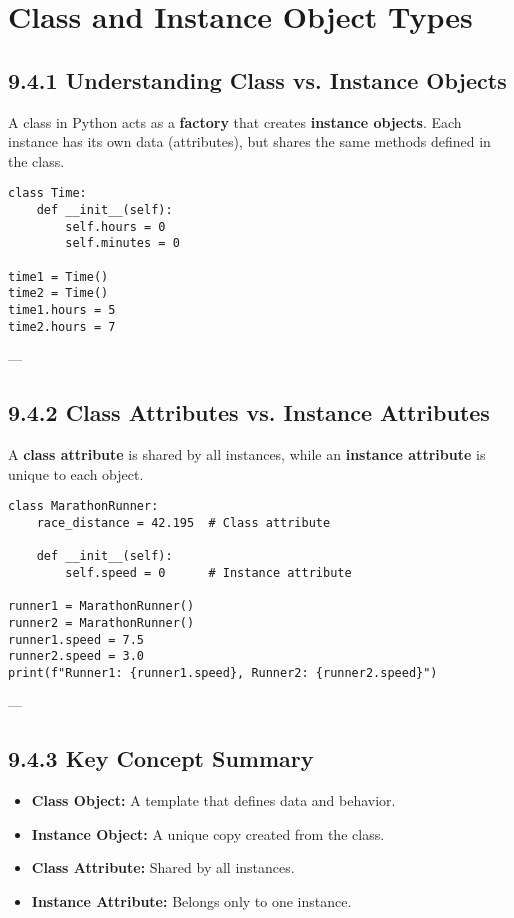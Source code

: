 \chapter{Class and Instance Object Types}

\section*{9.4.1 Understanding Class vs. Instance Objects}

A class in Python acts as a \textbf{factory} that creates \textbf{instance objects}. 
Each instance has its own data (attributes), but shares the same methods defined in the class.

\begin{verbatim}
class Time:
    def __init__(self):
        self.hours = 0
        self.minutes = 0

time1 = Time()
time2 = Time()
time1.hours = 5
time2.hours = 7
\end{verbatim}

---

\section*{9.4.2 Class Attributes vs. Instance Attributes}

A \textbf{class attribute} is shared by all instances, while an \textbf{instance attribute} is unique to each object.

\begin{verbatim}
class MarathonRunner:
    race_distance = 42.195  # Class attribute

    def __init__(self):
        self.speed = 0      # Instance attribute

runner1 = MarathonRunner()
runner2 = MarathonRunner()
runner1.speed = 7.5
runner2.speed = 3.0
print(f"Runner1: {runner1.speed}, Runner2: {runner2.speed}")
\end{verbatim}


---

\section*{9.4.3 Key Concept Summary}

\begin{itemize}
    \item \textbf{Class Object:} A template that defines data and behavior.
    \item \textbf{Instance Object:} A unique copy created from the class.
    \item \textbf{Class Attribute:} Shared by all instances.
    \item \textbf{Instance Attribute:} Belongs only to one instance.
\end{itemize}

